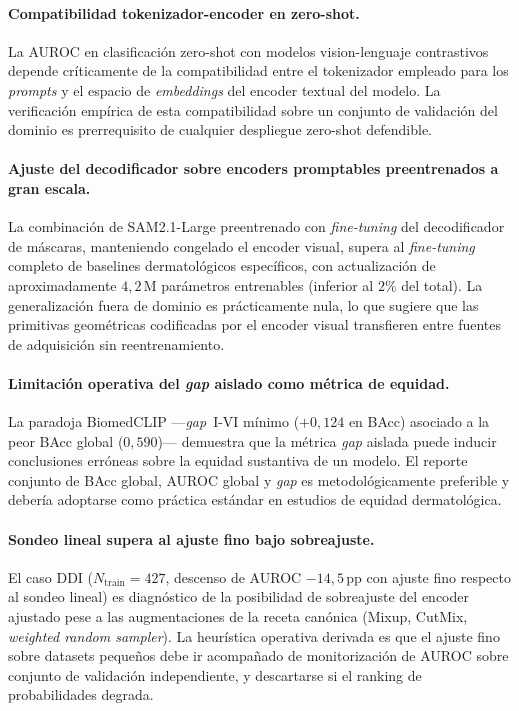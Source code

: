 \paragraph{Compatibilidad tokenizador-encoder en zero-shot.}
La AUROC en clasificación zero-shot con modelos vision-lenguaje
contrastivos depende críticamente de la compatibilidad entre el
tokenizador empleado para los \emph{prompts} y el espacio de
\emph{embeddings} del encoder textual del modelo. La verificación
empírica de esta compatibilidad sobre un conjunto de validación
del dominio es prerrequisito de cualquier despliegue zero-shot
defendible.

\paragraph{Ajuste del decodificador sobre encoders promptables
preentrenados a gran escala.}
La combinación de SAM2.1-Large preentrenado con \emph{fine-tuning}
del decodificador de máscaras, manteniendo congelado el encoder
visual, supera al
\emph{fine-tuning} completo de baselines dermatológicos
específicos, con actualización de aproximadamente $4{,}2$\,M
parámetros entrenables (inferior al $2\%$ del total). La
generalización fuera de dominio es prácticamente nula, lo que
sugiere que las primitivas geométricas codificadas por el encoder
visual transfieren entre fuentes de adquisición sin
reentrenamiento.

\paragraph{Limitación operativa del \emph{gap} aislado como métrica
de equidad.}
La paradoja BiomedCLIP ---\emph{gap}~I-VI mínimo ($+0{,}124$ en
BAcc) asociado a la peor BAcc global ($0{,}590$)--- demuestra que la
métrica \emph{gap} aislada puede inducir conclusiones erróneas
sobre la equidad sustantiva de un modelo. El reporte conjunto de
BAcc global, AUROC global y \emph{gap} es metodológicamente
preferible y debería adoptarse como práctica estándar en estudios
de equidad dermatológica.

\paragraph{Sondeo lineal supera al ajuste fino bajo sobreajuste.}
El caso DDI ($N_{\mathrm{train}} = 427$, descenso de AUROC
$-14{,}5$\,pp con ajuste fino respecto al sondeo lineal) es
diagnóstico de la posibilidad de sobreajuste del encoder ajustado
pese a las augmentaciones de la receta canónica (Mixup, CutMix,
\emph{weighted random sampler}). La heurística operativa derivada
es que el ajuste fino sobre datasets pequeños debe ir acompañado
de monitorización de AUROC sobre conjunto de validación
independiente, y descartarse si el ranking de probabilidades
degrada.

